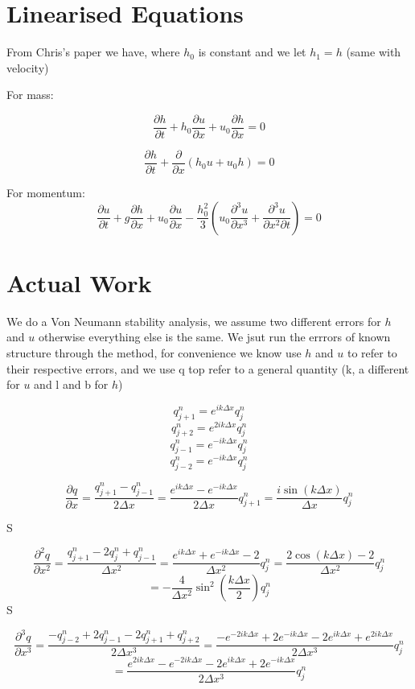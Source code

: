 \documentclass[12pt]{article}
\begin{document}
\section{Linearised Equations}
From Chris's paper we have, where $h_0$ is constant and we let $h_1 = h$ (same with velocity)

For mass:

\[\frac{\partial h}{\partial t} + h_0 \frac{\partial u}{\partial x} + u_0 \frac{\partial h}{\partial x} = 0\]

\[\frac{\partial h}{\partial t} + \frac{\partial}{\partial x} \left(h_0 u + u_0 h\right)= 0\]

For momentum:
\[ \frac{\partial u}{\partial t} + g\frac{\partial h}{\partial x}  + u_0\frac{\partial u}{\partial x} - \frac{h_0^2}{3}\left(u_0 \frac{\partial^3 u}{\partial x^3} + \frac{\partial^3 u}{\partial x^2 \partial t} \right)  = 0\]

\section{Actual Work}
We do a Von Neumann stability analysis, we assume two different errors for $h$ and $u$ otherwise everything else is the same. We jsut run the errrors of known structure through the method, for convenience we know use $h$ and $u$ to refer to their respective errors, and we use q top refer to a general quantity (k, a different for $u$ and l and b for $h$)

$$q^{n}_{j+1} = e^{ik\Delta x}q^n_j $$
$$q^{n}_{j+2} = e^{2ik\Delta x}q^n_j $$
$$q^{n}_{j-1} = e^{-ik\Delta x}q^n_j $$
$$q^{n}_{j-2} = e^{-ik\Delta x}q^n_j $$


\[\frac{\partial q}{\partial x} = \frac{q^{n}_{j+1} - q^{n}_{j-1}}{2\Delta x} =\frac{e^{ik\Delta x} - e^{-ik\Delta x}}{2\Delta x} q^{n}_{j+1} = \frac{i \sin\left(k \Delta x\right)}{\Delta x}q^{n}_{j} \]

S

\[\frac{\partial^2 q}{\partial x^2} = \frac{q^{n}_{j+1} -2q^{n}_{j} +q^{n}_{j-1}}{\Delta x^2} =\frac{e^{ik\Delta x} + e^{-ik\Delta x} - 2}{\Delta x^2} q^{n}_{j} = \frac{2 \cos\left(k\Delta x\right) - 2}{\Delta x^2} q^{n}_{j} \]
\[= -\frac{4}{\Delta x^2}\sin^2\left(\frac{k\Delta x}{2}\right) q^{n}_{j} \]
S

\[\frac{\partial^3 q}{\partial x^3} = \frac{-q^{n}_{j-2} +2q^{n}_{j-1} -2q^{n}_{j+1} +q^{n}_{j+2}}{2\Delta x^3} = \frac{- e^{-2ik\Delta x} +2e^{-ik\Delta x} -2e^{ik\Delta x} + e^{2ik\Delta x}}{2\Delta x^3}q^{n}_{j} \]
\[= \frac{e^{2ik\Delta x} - e^{-2ik\Delta x} -2e^{ik\Delta x} + 2e^{-ik\Delta x}}{2\Delta x^3}q^{n}_{j} \]
\end{document}
